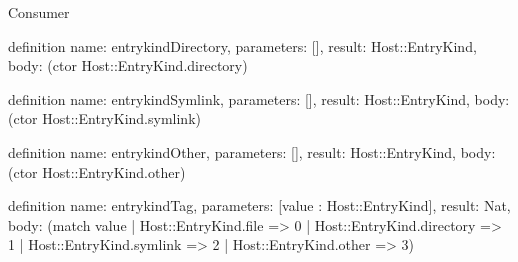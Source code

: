 \begin{lexlean}{Consumer}
\begin{semanticmodule}
definition{
  name: entrykindDirectory,
  parameters: [],
  result: Host::EntryKind,
  body: (ctor Host::EntryKind.directory)
}

definition{
  name: entrykindSymlink,
  parameters: [],
  result: Host::EntryKind,
  body: (ctor Host::EntryKind.symlink)
}

definition{
  name: entrykindOther,
  parameters: [],
  result: Host::EntryKind,
  body: (ctor Host::EntryKind.other)
}

definition{
  name: entrykindTag,
  parameters: [value : Host::EntryKind],
  result: Nat,
  body: (match value
    | Host::EntryKind.file => 0
    | Host::EntryKind.directory => 1
    | Host::EntryKind.symlink => 2
    | Host::EntryKind.other => 3)
}

\end{semanticmodule}
\end{lexlean}
